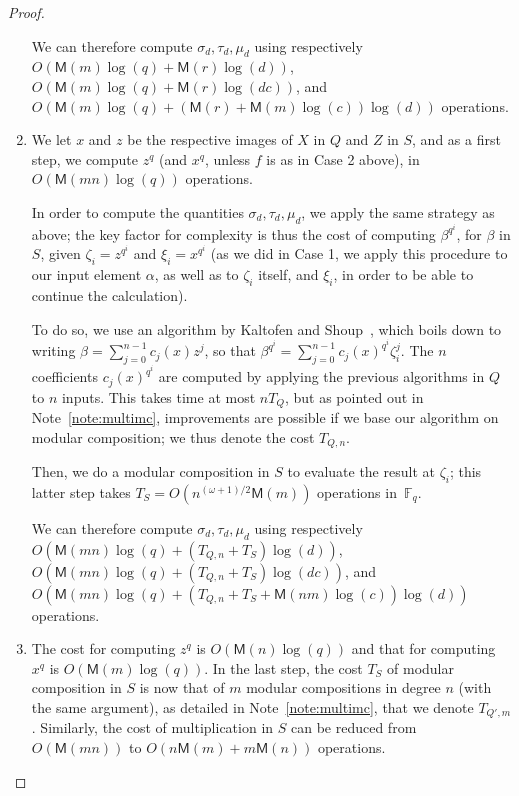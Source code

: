 \documentclass[12pt]{article}
\theoremstyle{plain}
\theoremstyle{definition}
\def\F{\ensuremath{\mathbb{F}}}
\def\MM{\ensuremath{\mathsf{M}}}
\newcounter{algorithm}
\begin{document}
\begin{proof}
\begin{enumerate}[label=\textbf{Case~\theenumi.},leftmargin=*, align=left]
  We can therefore compute $\sigma_d, \tau_d, \mu_d$ using respectively
  $O(\MM(m) \log(q) + \MM(r) \log(d))$,
  $O(\MM(m) \log(q) + \MM(r) \log(d c))$,
  and $O(\MM(m) \log(q) + (\MM(r) + \MM(m)\log(c))\log(d))$ operations.

\item
  We let $x$ and $z$ be the respective images of $X$ in $Q$ and $Z$ in $S$,
  and as a first step, we compute $z^q$ (and $x^q$, unless $f$ is as
  in Case 2 above), in $O(\MM(mn)\log(q))$ operations.
  
  In order to compute
  the quantities $\sigma_d,\tau_d,\mu_d$, we apply the same strategy
  as above; the key factor for complexity is thus the cost of
  computing $\beta^{q^i}$, for $\beta$ in $S$, given $\zeta_i =
  z^{q^i}$ and $\xi_i=x^{q^i}$ (as we did in Case 1, we apply this
  procedure to our input element $\alpha$, as well as to $\zeta_i$
  itself, and $\xi_i$, in order to be able to continue the
  calculation).

  To do so, we use an algorithm by Kaltofen and Shoup~\cite{kaltofen+shoup97},
  which boils down to writing $\beta=\sum_{j=0}^{n-1} c_j(x) z^j$, so
  that $\beta^{q^i} = \sum_{j=0}^{n-1} c_j(x)^{q^i} \zeta_i^j.$ The
  $n$ coefficients $c_j(x)^{q^i}$ are computed by applying the
  previous algorithms in $Q$ to $n$ inputs. This takes time at most
  $nT_Q$, but as pointed out in Note~\ref{note:multimc}, improvements 
  are possible if we base our algorithm on modular composition;
  we thus denote the cost $T_{Q,n}$.

  Then, we do a modular composition in $S$ to evaluate the result at
  $\zeta_i$; this latter step takes $T_S=O(n^{(\omega+1)/2} \MM(m))$
  operations in~$\F_q$.

  We can therefore compute $\sigma_d, \tau_d, \mu_d$ using respectively
  $O(\MM(mn)\log(q) + (T_{Q,n}+T_S)\log(d))$,
  $O(\MM(mn)\log(q) + (T_{Q,n}+T_S)\log(d c))$,
  and $O(\MM(mn)\log(q) + (T_{Q,n}+T_S + \MM(nm)\log(c))\log(d))$ operations.

\item
  The cost for computing $z^q$ is
  $O(\MM(n)\log(q))$ and that for computing $x^q$ is $O(\MM(m)\log(q))$.
  In the last step, the cost $T_S$ of modular
  composition in $S$ is now that of $m$ modular compositions in degree
  $n$ (with the same argument), as detailed in
  Note~\ref{note:multimc}, that we denote $T_{Q',m}$.
  Similarly, the cost of multiplication in $S$ can be reduced
  from $O(\MM(mn))$ to $O(n\MM(m) + m\MM(n))$ operations.


\end{enumerate}
\end{proof}
\end{document}

